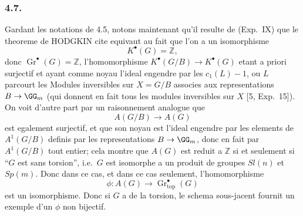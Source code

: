 \subsubsection*{4.7.}
Gardant les notations de 4.5, notons maintenant qu'il resulte de (Exp.\ IX) que le theoreme de HODGKIN cite equivaut au fait que l'on a un isomorphisme
\[
K^{\bullet}(G) = \mathbb{Z},
\]
donc $\operatorname{Gr}^{\bullet}(G) = \mathbb{Z}$, l'homomorphisme $K^{\bullet}(G/B) \to K^{\bullet}(G)$ etant a priori surjectif et ayant comme noyau l'ideal engendre par les $c_1(L) - 1$, ou $L$ parcourt les Modules inversibles sur $X = G/B$ associes aux representations $B \to \GG_m$ (qui donnent en fait tous les modules inversibles sur $X$ [5, Exp.\ 15]). On voit d'autre part par un raisonnement analogue que
\[
A(G/B) \longrightarrow A(G)
\]
est egalement surjectif, et que son noyau est l'ideal engendre par les elements de $A^{1}(G/B)$ definis par les representations $B \to \GG_m$, donc en fait par $A^{1}(G/B)$ tout entier; cela montre que $A(G)$ est reduit a $\mathbb{Z}$ si et seulement si ``$G$ est sans torsion'', i.e.\ $G$ est isomorphe a un produit de groupes $Sl(n)$ et $Sp(m)$. Donc dans ce cas, et dans ce cas seulement, l'homomorphisme
\[
\phi : A(G) \longrightarrow \operatorname{Gr}_{\mathrm{top}}^{\bullet}(G)
\]
est un isomorphisme. Donc si $G$ a de la torsion, le schema sous-jacent fournit un exemple d'un $\phi$ non bijectif.

